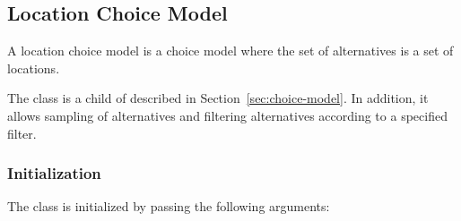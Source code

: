 \subsection{Location Choice Model}
%
\label{sec:location-choice-model}
 

A location choice model is a choice model where the set of alternatives is a
set of locations.

The class  is a child of  
described in Section~\ref{sec:choice-model}. In addition, it allows sampling
of alternatives and filtering alternatives according to a specified filter.

\subsubsection{Initialization}
%
The class is initialized by passing the following arguments:
